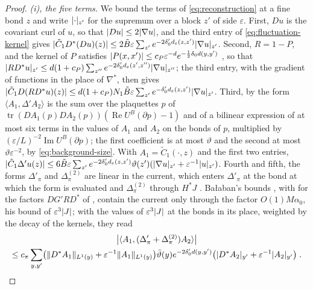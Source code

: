 \documentclass[11pt]{preprint}
\newcommand{\tr}{\operatorname{tr}}
\DeclarePairedDelimiter{\abs}{\lvert}{\rvert}
\DeclarePairedDelimiter{\norm}{\lVert}{\rVert}
\numberwithin{equation}{section}
\theoremstyle{definition}
\theoremstyle{remark}
\theoremstyle{plain}
\begin{document}
\begin{proof}
\emph{(i), the five terms.} We bound the terms of \eqref{eq:reconstruction} at a fine bond $z$ and write $\abs\cdot_{z'}$ for the supremum over a block $z'$ of side $\varepsilon$. First, $Du$ is the covariant curl of $u$, so that $\abs{Du} \leq 2\abs{\nabla u}$, and the third entry of \eqref{eq:fluctuation-kernel} gives $\abs{\tilde C_1D^*(Du)(z)} \leq 2\tilde B\varepsilon\sum_{z'}e^{-2\delta'_0d_\varepsilon(z,z')}\abs{\nabla u}_{z'}$. Second, $R = 1 - P$, and the kernel of $P$ satisfies $\abs{P(x, x')} \leq c_P\varepsilon^{-d}e^{-\frac12\delta_0d(y,y')}$ \cite[(3.49), p.~399]{BalabanPBG}, so that $\abs{RD^*u}_{z'} \leq d(1 + c_P)\sum_{z''}e^{-2\delta'_0d_\varepsilon(z',z'')}\abs{\nabla u}_{z''}$; the third entry, with the gradient of functions in the place of $\nabla^*$, then gives $\abs{\tilde C_1D(RD^*u)(z)} \leq d(1 + c_P)N_1\tilde B\varepsilon\sum_{z'}e^{-\delta'_0d_\varepsilon(z,z')}\abs{\nabla u}_{z'}$. Third, by \cite[(3.7), (3.10)]{BalabanPBG} the form $\langle A_1, \Delta'A_2\rangle$ is the sum over the plaquettes $p$ of $\tr(DA_1(p)DA_2(p))(\operatorname{Re}U^B(\partial p) - 1)$ and of a bilinear expression of at most six terms in the values of $A_1$ and $A_2$ on the bonds of $p$, multiplied by $(\varepsilon/L)^{-2}\operatorname{Im}U^B(\partial p)$; the first coefficient is at most $\vartheta$ and the second at most $\vartheta\varepsilon^{-2}$, by \eqref{eq:background-size}. With $A_1 = \tilde C_1(\cdot, z)$ and the first two entries, $\abs{\tilde C_1\Delta'u(z)} \leq 6\tilde B\varepsilon\sum_{z'}e^{-2\delta'_0d_\varepsilon(z,z')}\vartheta(z')(\abs{\nabla u}_{z'} + \varepsilon^{-1}\abs u_{z'})$. Fourth and fifth, the forms $\Delta'_\pi$ and $\Delta^{(2)}_\pi$ are linear in the current, which enters $\Delta'_\pi$ at the bond at which the form is evaluated \cite[(3.120)]{BalabanPBG} and $\Delta^{(2)}_\pi$ through $H^*J$ \cite[(3.136)]{BalabanPBG}. Ba{\l}aban's bounds \cite[(3.131), (3.137)]{BalabanPBG}, with \cite[(3.42), (3.49)]{BalabanPBG} for the factors $DG'RD^*$ of \cite[(3.135)]{BalabanPBG}, contain the current only through the factor $O(1)M\alpha_0$, his bound \cite[(3.36)]{BalabanPBG} of $\varepsilon^3\abs J$; with the values of $\varepsilon^3\abs J$ at the bonds in its place, weighted by the decay of the kernels, they read
\begin{multline*}
    \bigl\lvert\langle A_1, (\Delta'_\pi + \Delta^{(2)}_\pi)A_2\rangle\bigr\rvert\\
    \leq c_\pi\sum_{y, y'}\bigl(\norm{D^*A_1}_{L^1(y)} + \varepsilon^{-1}\norm{A_1}_{L^1(y)}\bigr)\bar\vartheta(y)e^{-2\delta'_0d(y,y')}\bigl(\abs{D^*A_2}_{y'} + \varepsilon^{-1}\abs{A_2}_{y'}\bigr)\;.

\end{multline*}
\end{proof}
\end{document}

